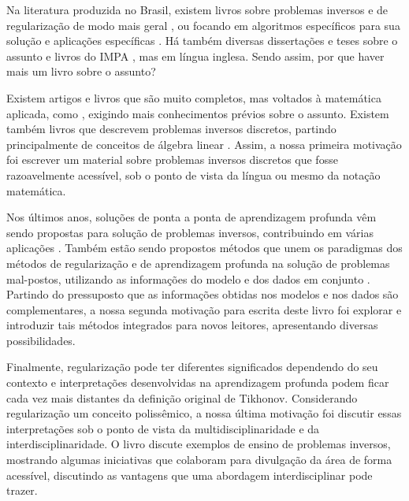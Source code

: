 Na literatura produzida no Brasil, existem livros sobre problemas inversos e de regularização de modo mais geral \cite{Neto2005}, ou focando em algoritmos específicos para sua solução \cite{Neto2016} e aplicações específicas \cite{2016menin}. Há também diversas dissertações e teses sobre o assunto e livros do IMPA \cite{baumeister2005topics, bleyer2015novel}, mas em língua inglesa. Sendo assim, por que haver mais um livro sobre o assunto?

Existem artigos e livros que são muito completos, mas voltados à matemática aplicada, como \cite{Benning2018, engl1996regularization}, exigindo mais conhecimentos prévios sobre o assunto. Existem também livros que descrevem problemas inversos discretos, partindo principalmente de conceitos de álgebra linear \cite{aster2019parameter, hansen2010discrete, Mueller2012}. Assim, a nossa primeira motivação foi escrever um material sobre problemas inversos discretos que fosse razoavelmente acessível, sob o ponto de vista da língua ou mesmo da notação matemática.

Nos últimos anos, soluções de ponta a ponta de aprendizagem profunda vêm sendo propostas para solução de problemas inversos, contribuindo em várias aplicações \cite{Adler2021, Bai2020, Belthangady2019, Koh2021, Ongie2020, Su2022}. Também estão sendo propostos métodos que unem os paradigmas dos métodos de regularização e de aprendizagem profunda na solução de problemas mal-postos, utilizando as informações do modelo e dos dados em conjunto \cite{Arridge2019}.  Partindo do pressuposto que as informações obtidas nos modelos e nos dados são complementares, a nossa segunda motivação para escrita deste livro foi explorar e introduzir tais métodos integrados para novos leitores, apresentando diversas possibilidades.  

Finalmente, regularização pode ter diferentes significados dependendo do seu contexto  \cite{Chen2002} e interpretações desenvolvidas na aprendizagem profunda \cite{goodfellow2016deep} podem ficar cada vez mais distantes da definição original de Tikhonov. Considerando regularização um conceito polissêmico, a nossa última motivação foi discutir essas interpretações sob o ponto de vista da multidisciplinaridade e da interdisciplinaridade. O livro discute exemplos de ensino de problemas inversos, mostrando algumas iniciativas que colaboram para divulgação da área de forma acessível, discutindo as vantagens que uma abordagem interdisciplinar pode trazer.

  
\newpage
\thispagestyle{empty}
